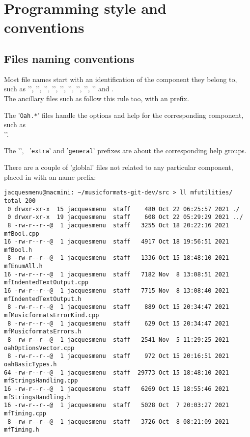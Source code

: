 
\chapter{Programming style and conventions}


\section{Files naming conventions}

Most file names start with an identification of the component they belong to, such as '', '', '', '', '', '', '', '', '' and .\\
The ancillary files such as  follow this rule too, with an  prefix.

The '{\tt *Oah.*}' files handle the options and help for the corresponding component, such as\\ ''.

The '', \, '{\tt extra}' and '{\tt general}' prefixes are about the corresponding help groups.

There are a couple of 'globlal' files not related to any particular component, placed in \mfutilities{} with an  name prefix:
\begin{lstlisting}[language=Terminal]
jacquesmenu@macmini: ~/musicformats-git-dev/src > ll mfutilities/
total 200
 0 drwxr-xr-x  15 jacquesmenu  staff    480 Oct 22 06:25:57 2021 ./
 0 drwxr-xr-x  19 jacquesmenu  staff    608 Oct 22 05:29:29 2021 ../
 8 -rw-r--r--@  1 jacquesmenu  staff   3255 Oct 18 20:22:16 2021 mfBool.cpp
16 -rw-r--r--@  1 jacquesmenu  staff   4917 Oct 18 19:56:51 2021 mfBool.h
 8 -rw-r--r--@  1 jacquesmenu  staff   1336 Oct 15 18:48:10 2021 mfEnumAll.h
16 -rw-r--r--@  1 jacquesmenu  staff   7182 Nov  8 13:08:51 2021 mfIndentedTextOutput.cpp
16 -rw-r--r--@  1 jacquesmenu  staff   7715 Nov  8 13:08:40 2021 mfIndentedTextOutput.h
 8 -rw-r--r--@  1 jacquesmenu  staff    889 Oct 15 20:34:47 2021 mfMusicformatsErrorKind.cpp
 8 -rw-r--r--@  1 jacquesmenu  staff    629 Oct 15 20:34:47 2021 mfMusicformatsErrors.h
 8 -rw-r--r--@  1 jacquesmenu  staff   2541 Nov  5 11:29:25 2021 oahOptionsVector.cpp
 8 -rw-r--r--@  1 jacquesmenu  staff    972 Oct 15 20:16:51 2021 oahBasicTypes.h
64 -rw-r--r--@  1 jacquesmenu  staff  29773 Oct 15 18:48:10 2021 mfStringsHandling.cpp
16 -rw-r--r--@  1 jacquesmenu  staff   6269 Oct 15 18:55:46 2021 mfStringsHandling.h
16 -rw-r--r--@  1 jacquesmenu  staff   5028 Oct  7 20:03:27 2021 mfTiming.cpp
 8 -rw-r--r--@  1 jacquesmenu  staff   3726 Oct  8 08:21:09 2021 mfTiming.h
\end{lstlisting}

